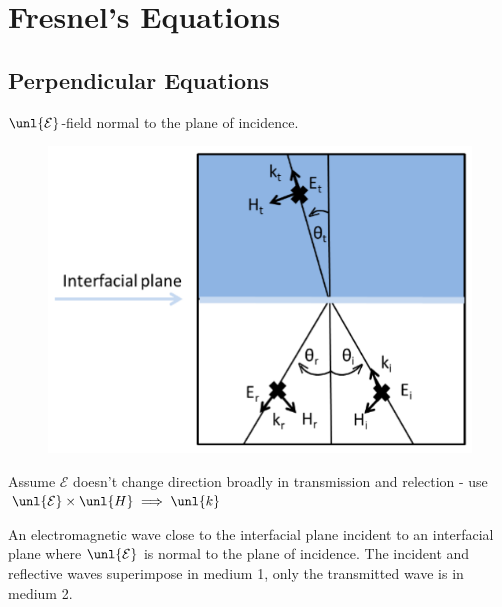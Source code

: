 \documentclass[a4paper, 11pt, normalem]{report}
\renewcommand\E{\mathcal{E}}
\newcommand\uE{\unl{\E}}
\newcommand\vk{\unl{k}}
\begin{document}
\section{Fresnel's Equations}
\subsection{Perpendicular Equations}
$\uE$-field normal to the plane of incidence.

\begin{figure}[H]
	\centering
	\includegraphics[scale=0.4]{normfres.png}
\end{figure}

Assume $\E$ doesn't change direction broadly in transmission and relection - use $\uE \times \unl{H} \implies \vk$

An electromagnetic wave close to the interfacial plane incident to an interfacial plane where $\uE$ is normal to the plane of incidence.
The incident and reflective waves superimpose in medium 1, only the transmitted wave is in medium 2.
\end{document}
